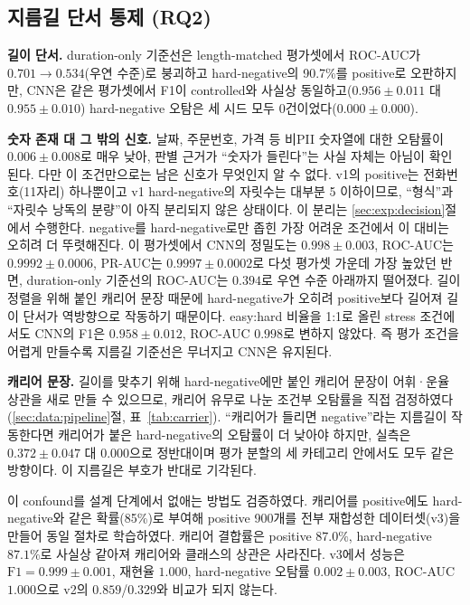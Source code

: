 \documentclass[11pt]{article}
\begin{document}
\subsection{지름길 단서 통제 (RQ2)}
\textbf{길이 단서.} duration-only 기준선은 length-matched 평가셋에서 ROC-AUC가
$0.701 \to 0.534$(우연 수준)로 붕괴하고 hard-negative의 90.7\%를 positive로 오판하지만,
CNN은 같은 평가셋에서 F1이 controlled와 사실상 동일하고($0.956\pm0.011$ 대
$0.955\pm0.010$) hard-negative 오탐은 세 시드 모두 0건이었다($0.000\pm0.000$).

\textbf{숫자 존재 대 그 밖의 신호.} 날짜, 주문번호, 가격 등 비PII 숫자열에 대한 오탐률이
$0.006\pm0.008$로 매우 낮아, 판별 근거가 ``숫자가 들린다''는 사실 자체는 아님이 확인된다.
다만 이 조건만으로는 남은 신호가 무엇인지 알 수 없다. v1의 positive는 전화번호(11자리)
하나뿐이고 v1 hard-negative의 자릿수는 대부분 5 이하이므로, ``형식''과 ``자릿수 낭독의 분량''이
아직 분리되지 않은 상태이다. 이 분리는 \ref{sec:exp:decision}절에서 수행한다.
negative를 hard-negative로만 좁힌 가장 어려운 조건에서 이 대비는 오히려 더 뚜렷해진다. 이
평가셋에서 CNN의 정밀도는 $0.998\pm0.003$, ROC-AUC는 $0.9992\pm0.0006$, PR-AUC는
$0.9997\pm0.0002$로 다섯 평가셋 가운데 가장 높았던 반면, duration-only 기준선의 ROC-AUC는
$0.394$로 우연 수준 아래까지 떨어졌다. 길이 정렬을 위해 붙인 캐리어 문장 때문에
hard-negative가 오히려 positive보다 길어져 길이 단서가 역방향으로 작동하기 때문이다.
easy:hard 비율을 1:1로 올린 stress 조건에서도 CNN의 F1은 $0.958\pm0.012$, ROC-AUC $0.998$로
변하지 않았다. 즉 평가 조건을 어렵게 만들수록 지름길 기준선은 무너지고 CNN은 유지된다.

\textbf{캐리어 문장.} 길이를 맞추기 위해 hard-negative에만 붙인 캐리어 문장이 어휘·운율
상관을 새로 만들 수 있으므로, 캐리어 유무로 나눈 조건부 오탐률을 직접 검정하였다
(\ref{sec:data:pipeline}절, 표~\ref{tab:carrier}). ``캐리어가 들리면 negative''라는 지름길이
작동한다면 캐리어가 붙은 hard-negative의 오탐률이 더 낮아야 하지만, 실측은 $0.372\pm0.047$
대 $0.000$으로 정반대이며 평가 분할의 세 카테고리 안에서도 모두 같은 방향이다. 이 지름길은
부호가 반대로 기각된다.

이 confound를 설계 단계에서 없애는 방법도 검증하였다. 캐리어를 positive에도 hard-negative와
같은 확률(85\%)로 부여해 positive 900개를 전부 재합성한 데이터셋(v3)을 만들어 동일 절차로
학습하였다. 캐리어 결합률은 positive $87.0\%$, hard-negative $87.1\%$로 사실상 같아져 캐리어와
클래스의 상관은 사라진다. v3에서 성능은 $\text{F1}=0.999\pm0.001$, 재현율 $1.000$,
hard-negative 오탐률 $0.002\pm0.003$, ROC-AUC $1.000$으로 v2의 $0.859$/$0.329$와 비교가 되지
않는다.
\end{document}
